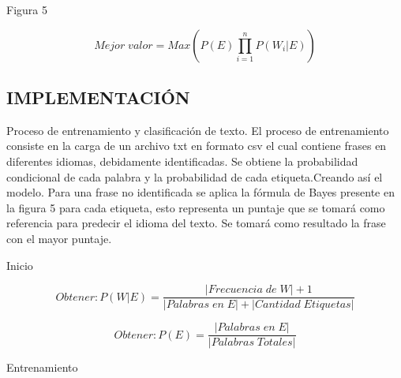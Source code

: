 \documentclass[sigconf]{acmart}
\begin{document}
Figura 5

\begin{equation}
\label{eq:bayes4}
{Mejor\;valor} = Max(P(E) \prod_{i=1}^{n} P(W_i|E))  
\end{equation}
\subsection{IMPLEMENTACIÓN}
Proceso de entrenamiento y clasificación de texto. El proceso de entrenamiento consiste en la carga de un archivo txt en formato csv el cual contiene frases en diferentes idiomas, debidamente identificadas. Se obtiene la probabilidad condicional de cada palabra y la probabilidad de cada etiqueta.Creando así el modelo. Para una frase no identificada se aplica la fórmula de Bayes presente en la figura 5 para cada etiqueta, esto representa un puntaje que se tomará como referencia para predecir el idioma del texto. Se tomará como resultado la frase con el mayor puntaje.\citep{Gupte}\citep{Space}
\newline
\newline
\newline
\newline
\newline
\newline
\newline
\newline
\newline
\newline
\newline
\newline
\newline
\newline
\newline
\newline
\newline
\newline
\newline
\newline
\begin{algorithm}[H]
\SetAlgoLined
 Inicio\;
 
 {
     {
            \begin{fleqn}
            \setlength\belowdisplayskip{0pt}
            \begin{equation}
                  Obtener: P(W|E) = \frac {|Frecuencia\;de\;W| + 1} {|Palabras\;en\;E| + |Cantidad\;Etiquetas|}
            \end{equation}
            \end{fleqn}%
     }
     
    \begin{equation}
            Obtener: P(E) = \frac {|Palabras\;en\;E|} {|Palabras\;Totales|}
    \end{equation}
 }
 \caption{Entrenamiento}
\end{algorithm}
\end{document}
